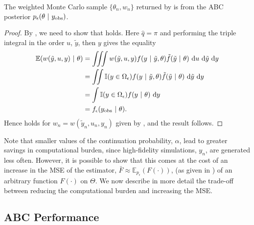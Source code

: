 \documentclass[review,demo]{siamonline190516}
\begin{document}
\begin{proposition}
\label{MFABCValidity}
The weighted Monte Carlo sample $\{ \theta_n, w_n\}$ returned by  is from the ABC posterior $p_\epsilon(\theta~|~y_{\mathrm{obs}})$.
\end{proposition}
\begin{proof}
By , we need to show that  holds.
Here $\hat q = \pi$ and performing the triple integral in the order $u$, $\tilde y$, then $y$ gives the equality
\begin{align*}
\mathbb E(w(\tilde y, u, y)~|~\theta) 
&= \iiint w(\tilde y, u, y) f(y~|~\tilde y, \theta) \tilde f(\tilde y~|~\theta) ~\mathrm du ~\mathrm d\tilde y ~\mathrm dy 
\\
&= \iint \mathbb I(y \in \Omega_\epsilon) f(y~|~\tilde y, \theta) \tilde f(\tilde y~|~\theta) ~\mathrm d\tilde y ~\mathrm dy
\\
&= \int \mathbb I(y \in \Omega_\epsilon) f(y~|~\theta) ~\mathrm dy
\\
&= f_\epsilon(y_{\mathrm{obs}}~|~\theta).
\end{align*}
Hence  holds for $w_n = w(\tilde y_n, u_n, y_n)$ given by , and the result follows.
\end{proof}

Note that smaller values of the continuation probability, $\alpha$, lead to greater savings in computational burden, since high-fidelity simulations, $y_n$, are generated less often.
However, it is possible to show that this comes at the cost of an increase in the MSE of the estimator, $\bar F \approx \mathbb E_{p_\epsilon}(F(\cdot))$, (as given in ) of an arbitrary function $F(\cdot)$ on $\Theta$.
We now describe in more detail the trade-off between reducing the computational burden and increasing the MSE.

\subsection{ABC Performance}
\label{s:Performance}
\end{document}
